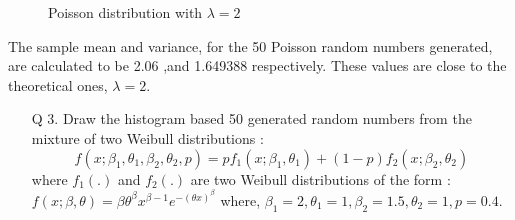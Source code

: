 \documentclass[11pt]{article}
\begin{document}
\begin{figure}[H]
	\centering
		\caption{Poisson distribution with $\lambda = 2$}
\end{figure}

The sample mean and variance, for the 50 Poisson random numbers generated, are calculated to be 2.06 ,and 1.649388 respectively.
These values are close to the theoretical ones, $\lambda = 2$.
\newpage
\begin{enumerate}
\item[Q 3.] Draw the histogram based 50 generated random numbers from the mixture of two Weibull distributions :
$$f(x;\beta_{1},\theta_{1},\beta_{2},\theta_{2},p) = pf_{1}(x;\beta_{1},\theta_{1}) + (1 - p)f_{2}(x;\beta_{2},\theta_{2})$$
where $f_{1}(.)$ and $f_{2}(.)$ are two Weibull distributions of the form : $f(x;\beta,\theta) = \beta\theta^{\beta}x^{\beta-1}e^{-(\theta x)^{\beta}}$ where, $\beta_{1} = 2, \theta_{1} = 1, \beta_{2} = 1.5, \theta_{2} = 1, p = 0.4$.
\end{enumerate}
\end{document}
